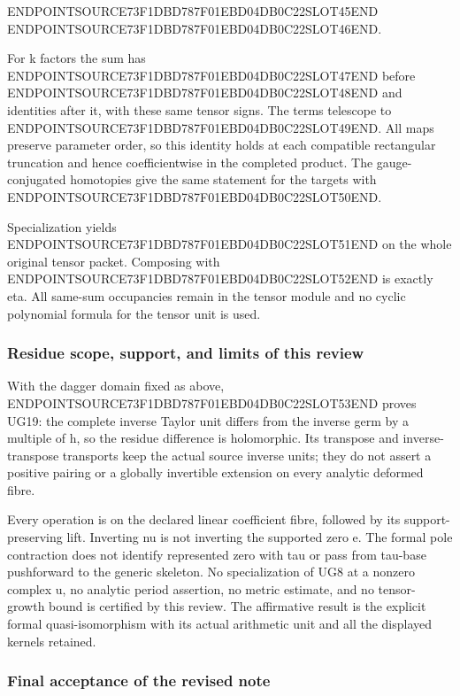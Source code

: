 ENDPOINTSOURCE73F1DBD787F01EBD04DB0C22SLOT45END ENDPOINTSOURCE73F1DBD787F01EBD04DB0C22SLOT46END.

For k factors the sum has ENDPOINTSOURCE73F1DBD787F01EBD04DB0C22SLOT47END before ENDPOINTSOURCE73F1DBD787F01EBD04DB0C22SLOT48END and identities after it, with these same tensor signs. The terms telescope to ENDPOINTSOURCE73F1DBD787F01EBD04DB0C22SLOT49END. All maps preserve parameter order, so this identity holds at each compatible rectangular truncation and hence coefficientwise in the completed product. The gauge-conjugated homotopies give the same statement for the targets with ENDPOINTSOURCE73F1DBD787F01EBD04DB0C22SLOT50END.

Specialization yields ENDPOINTSOURCE73F1DBD787F01EBD04DB0C22SLOT51END on the whole original tensor packet. Composing with ENDPOINTSOURCE73F1DBD787F01EBD04DB0C22SLOT52END is exactly eta. All same-sum occupancies remain in the tensor module and no cyclic polynomial formula for the tensor unit is used.

\subsubsection{Residue scope, support, and limits of this review}\label{endpoint-f1_unit_gauge_review--residue-scope-support-and-limits-of-this-review}

With the dagger domain fixed as above, ENDPOINTSOURCE73F1DBD787F01EBD04DB0C22SLOT53END proves UG19: the complete inverse Taylor unit differs from the inverse germ by a multiple of h, so the residue difference is holomorphic. Its transpose and inverse-transpose transports keep the actual source inverse units; they do not assert a positive pairing or a globally invertible extension on every analytic deformed fibre.

Every operation is on the declared linear coefficient fibre, followed by its support-preserving lift. Inverting nu is not inverting the supported zero e. The formal pole contraction does not identify represented zero with tau or pass from tau-base pushforward to the generic skeleton. No specialization of UG8 at a nonzero complex u, no analytic period assertion, no metric estimate, and no tensor-growth bound is certified by this review. The affirmative result is the explicit formal quasi-isomorphism with its actual arithmetic unit and all the displayed kernels retained.

\subsubsection{Final acceptance of the revised note}\label{endpoint-f1_unit_gauge_review--final-acceptance-of-the-revised-note}

